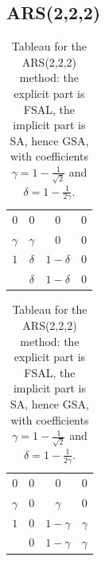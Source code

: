 \documentclass{article}
\begin{document}
\subsection{ARS(2,2,2)}
\begin{table}[H]
    \centering
        \begin{tabular}{c|ccc}
        $0$ & $0$ & $0$ & $0$  \\
        $\gamma$ & $\gamma$ & $0$ & $0$  \\
        $1$ & $\delta$ & $1-\delta$ & $0$  \\
        \hline
        & $\delta$ & $1-\delta$ & $0$ \\
    \end{tabular}
    \quad
    \begin{tabular}{c|ccc}
        $0$ & $0$ & $0$ & $0$ \\
        $\gamma$  & $0$ & $\gamma$ & $0$ \\
        $1$ & $0$ & $1-\gamma$ & $\gamma$ \\
        \hline
        & $0$ & $1-\gamma$ & $\gamma$ \\
    \end{tabular}
    \caption{Tableau for the ARS(2,2,2) method: the explicit part is FSAL, the implicit part is  SA, hence GSA, with coefficients $\gamma = 1 - \frac{1}{\sqrt{2}}$ and $\delta = 1 - \frac{1}{2\gamma}$.}
    \label{tab:ARS222}
\end{table}

\end{document}
